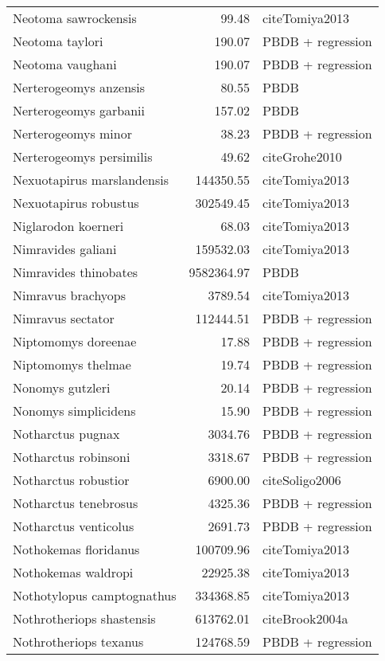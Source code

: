 \begin{table}[ht]
\begin{tabular}{lrl}
  Neotoma sawrockensis & 99.48 & cite{Tomiya2013} \\ 
  Neotoma taylori & 190.07 & PBDB + regression \\ 
  Neotoma vaughani & 190.07 & PBDB + regression \\ 
  Nerterogeomys anzensis & 80.55 & PBDB \\ 
  Nerterogeomys garbanii & 157.02 & PBDB \\ 
  Nerterogeomys minor & 38.23 & PBDB + regression \\ 
  Nerterogeomys persimilis & 49.62 & cite{Grohe2010} \\ 
  Nexuotapirus marslandensis & 144350.55 & cite{Tomiya2013} \\ 
  Nexuotapirus robustus & 302549.45 & cite{Tomiya2013} \\ 
  Niglarodon koerneri & 68.03 & cite{Tomiya2013} \\ 
  Nimravides galiani & 159532.03 & cite{Tomiya2013} \\ 
  Nimravides thinobates & 9582364.97 & PBDB \\ 
  Nimravus brachyops & 3789.54 & cite{Tomiya2013} \\ 
  Nimravus sectator & 112444.51 & PBDB + regression \\ 
  Niptomomys doreenae & 17.88 & PBDB + regression \\ 
  Niptomomys thelmae & 19.74 & PBDB + regression \\ 
  Nonomys gutzleri & 20.14 & PBDB + regression \\ 
  Nonomys simplicidens & 15.90 & PBDB + regression \\ 
  Notharctus pugnax & 3034.76 & PBDB + regression \\ 
  Notharctus robinsoni & 3318.67 & PBDB + regression \\ 
  Notharctus robustior & 6900.00 & cite{Soligo2006} \\ 
  Notharctus tenebrosus & 4325.36 & PBDB + regression \\ 
  Notharctus venticolus & 2691.73 & PBDB + regression \\ 
  Nothokemas floridanus & 100709.96 & cite{Tomiya2013} \\ 
  Nothokemas waldropi & 22925.38 & cite{Tomiya2013} \\ 
  Nothotylopus camptognathus & 334368.85 & cite{Tomiya2013} \\ 
  Nothrotheriops shastensis & 613762.01 & cite{Brook2004a} \\ 
  Nothrotheriops texanus & 124768.59 & PBDB + regression \\ 

\end{tabular}
\end{table}
